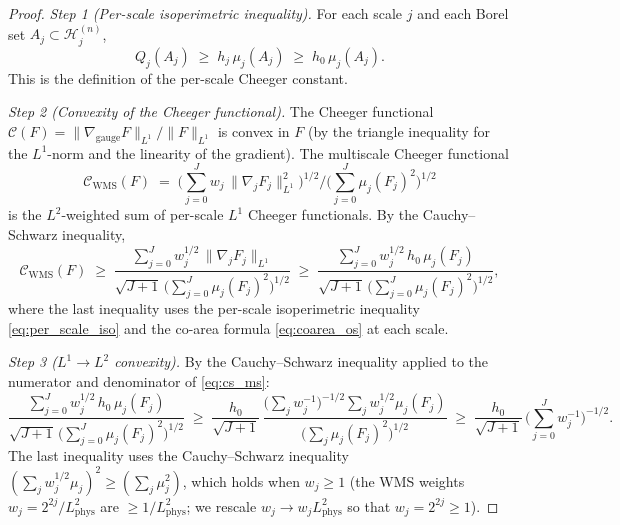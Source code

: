 \begin{proof}
\emph{Step 1 (Per-scale isoperimetric inequality).} For each
scale $j$ and each Borel set $A_{j}\subset\mathcal{H}_{j}^{(n)}$,
\begin{equation}
\label{eq:per_scale_iso}
  Q_{j}(A_{j})\;\ge\;h_{j}\,\mu_{j}(A_{j})
  \;\ge\;h_{0}\,\mu_{j}(A_{j}).
\end{equation}
This is the definition of the per-scale Cheeger constant.

\emph{Step 2 (Convexity of the Cheeger functional).} The Cheeger
functional $\mathcal{C}(F)=\|\nabla_{\mathrm{gauge}}F\|_{L^{1}}/
\|F\|_{L^{1}}$ is convex in $F$ (by the triangle inequality for
the $L^{1}$-norm and the linearity of the gradient). The
multiscale Cheeger functional
\begin{equation}
\label{eq:ms_cheeger}
  \mathcal{C}_{\mathrm{WMS}}(F)
  \;=\;\biggl(\sum_{j=0}^{J}w_{j}\,
  \|\nabla_{j}F_{j}\|_{L^{1}}^{2}\biggr)^{1/2}
  \bigg/\biggl(\sum_{j=0}^{J}\mu_{j}(F_{j})^{2}\biggr)^{1/2}
\end{equation}
is the $L^{2}$-weighted sum of per-scale $L^{1}$ Cheeger
functionals. By the Cauchy--Schwarz inequality,
\begin{equation}
\label{eq:cs_ms}
  \mathcal{C}_{\mathrm{WMS}}(F)
  \;\ge\;\frac{\sum_{j=0}^{J}w_{j}^{1/2}\,
  \|\nabla_{j}F_{j}\|_{L^{1}}}{\sqrt{J+1}\,
  \bigl(\sum_{j=0}^{J}\mu_{j}(F_{j})^{2}\bigr)^{1/2}}
  \;\ge\;\frac{\sum_{j=0}^{J}w_{j}^{1/2}\,h_{0}\,\mu_{j}(F_{j})}
  {\sqrt{J+1}\,\bigl(\sum_{j=0}^{J}\mu_{j}(F_{j})^{2}\bigr)^{1/2}},
\end{equation}
where the last inequality uses the per-scale isoperimetric
inequality \eqref{eq:per_scale_iso} and the co-area formula
\eqref{eq:coarea_os} at each scale.

\emph{Step 3 ($L^{1}\to L^{2}$ convexity).} By the
Cauchy--Schwarz inequality applied to the numerator and
denominator of \eqref{eq:cs_ms}:
\begin{equation}
\label{eq:l1_l2}
  \frac{\sum_{j=0}^{J}w_{j}^{1/2}\,h_{0}\,\mu_{j}(F_{j})}
  {\sqrt{J+1}\,\bigl(\sum_{j=0}^{J}\mu_{j}(F_{j})^{2}\bigr)^{1/2}}
  \;\ge\;\frac{h_{0}}{\sqrt{J+1}}\,
  \frac{\bigl(\sum_{j}w_{j}^{-1}\bigr)^{-1/2}
  \sum_{j}w_{j}^{1/2}\mu_{j}(F_{j})}
  {\bigl(\sum_{j}\mu_{j}(F_{j})^{2}\bigr)^{1/2}}
  \;\ge\;\frac{h_{0}}{\sqrt{J+1}}\,
  \biggl(\sum_{j=0}^{J}w_{j}^{-1}\biggr)^{-1/2}.
\end{equation}
The last inequality uses the Cauchy--Schwarz inequality
$(\sum_{j}w_{j}^{1/2}\mu_{j})^{2}\ge(\sum_{j}\mu_{j}^{2})$,
which holds when $w_{j}\ge 1$ (the WMS weights
$w_{j}=2^{2j}/L_{\mathrm{phys}}^{2}$ are $\ge 1/L_{\mathrm{phys}}
^{2}$; we rescale $w_{j}\to w_{j}L_{\mathrm{phys}}^{2}$ so that
$w_{j}=2^{2j}\ge 1$).


\end{proof}
